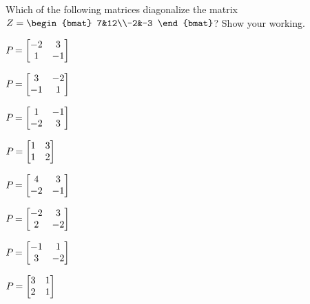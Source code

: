 \sectionExercises


\begin{exercise} \label{ex:whichp} 
Which of the following matrices diagonalize the matrix \(Z=\begin{bmat} 7&12\\-2&-3 \end{bmat}\)?  
Show your working.
\begin{Parts}
\item \(P_{\alph{enumii}}=\begin{bmatrix} -2&3\\1&-1 \end{bmatrix}\)

\item \(P_{\alph{enumii}}=\begin{bmatrix} 3&-2\\-1&1 \end{bmatrix}\)

\item \(P_{\alph{enumii}}=\begin{bmatrix} 1&-1\\-2&3 \end{bmatrix}\)

\item \(P_{\alph{enumii}}=\begin{bmatrix} 1&3\\1&2 \end{bmatrix}\)

\item \(P_{\alph{enumii}}=\begin{bmatrix} 4&3\\-2&-1 \end{bmatrix}\)

\item \(P_{\alph{enumii}}=\begin{bmatrix} -2&3\\2&-2 \end{bmatrix}\)

\item \(P_{\alph{enumii}}=\begin{bmatrix} -1&1\\3&-2 \end{bmatrix}\)

\item \(P_{\alph{enumii}}=\begin{bmatrix} 3&1\\2&1 \end{bmatrix}\)

\end{Parts}
\end{exercise}



